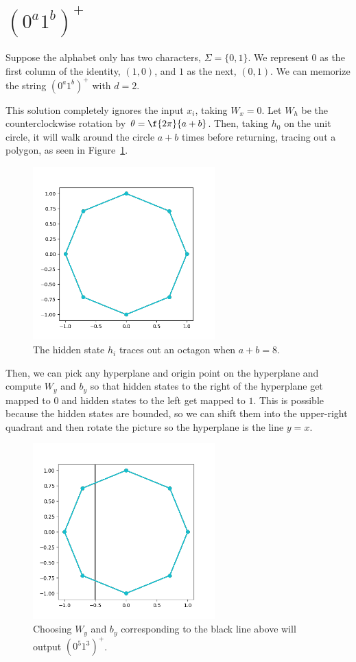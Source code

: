 \section*{${(0^a 1^b)}^+$}
Suppose the alphabet only has two characters, $\Sigma = \{0, 1\}$. We represent $0$ as the first column of the identity, $(1, 0)$, and $1$ as the next, $(0, 1)$. We can memorize the string ${(0^a 1^b)}^+$ with $d = 2$. 

This solution completely ignores the input $x_i$, taking $W_x = 0$. Let $W_h$ be the counterclockwise rotation by $\theta = \f{2\pi}{a + b}$. Then, taking $h_0$ on the unit circle, it will walk around the circle $a + b$ times before returning, tracing out a polygon, as seen in Figure~\ref{fig:octagon}.

\begin{figure}[h]
\centering
\includegraphics[width=7cm]{img/octagon.png}
\caption{The hidden state $h_i$ traces out an octagon when $a + b = 8$.}\label{fig:octagon}
\end{figure}

Then, we can pick any hyperplane and origin point on the hyperplane and compute $W_y$ and $b_y$ so that hidden states to the right of the hyperplane get mapped to $0$ and hidden states to the left get mapped to $1$. This is possible because the hidden states are bounded, so we can shift them into the upper-right quadrant and then rotate the picture so the hyperplane is the line $y = x$.

\begin{figure}[h]
\centering
\includegraphics[width=7cm]{img/octagon-with-hyperplane.png}
\caption{Choosing $W_y$ and $b_y$ corresponding to the black line above will output $(0^5 1^3)^+$.}\label{fig:octagon-with-hyperplane}
\end{figure}

